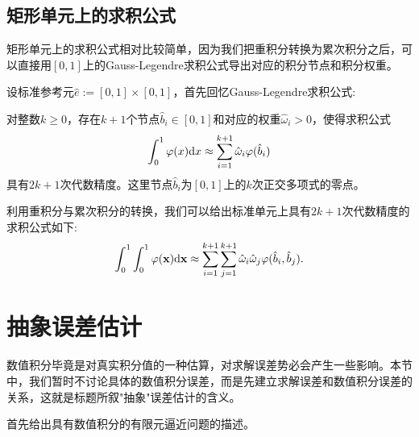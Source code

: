 \subsection{矩形单元上的求积公式}
矩形单元上的求积公式相对比较简单，因为我们把重积分转换为累次积分之后，可以直接用$[0,1]$上的Gauss-Legendre求积公式导出对应的积分节点和积分权重。

设标准参考元$\hat{e}:=[0,1]\times[0,1]$，首先回忆Gauss-Legendre求积公式:
\begin{definition}
    对整数$k\ge 0$，存在$k+1$个节点$\hat{b}_{i}\in [0,1]$和对应的权重$\hat{\omega}_{i}>0$，使得求积公式
    \begin{equation}
        \int_{0}^{1}\varphi(x)\mathrm{d} x\approx\sum_{i=1}^{k+1}\hat{\omega}_{i}\varphi(\hat{b}_{i})
    \end{equation}
    具有$2k+1$次代数精度。这里节点$\hat{b}_{i}$为$[0,1]$上的$k$次正交多项式的零点。
\end{definition}
利用重积分与累次积分的转换，我们可以给出标准单元上具有$2k+1$次代数精度的求积公式如下:
\begin{equation}
    \int_{0}^{1}\int_{0}^{1}\varphi(\mathbf{x})\mathrm{d}\mathbf{x}\approx\sum_{i=1}^{k+1}\sum_{j=1}^{k+1}\hat{\omega}_{i}\hat{\omega}_{j}\varphi(\hat{b}_{i},\hat{b}_{j}).
\end{equation}
\section{抽象误差估计}
数值积分毕竟是对真实积分值的一种估算，对求解误差势必会产生一些影响。本节中，我们暂时不讨论具体的数值积分误差，而是先建立求解误差和数值积分误差的关系，这就是标题所叙"抽象"误差估计的含义。

首先给出具有数值积分的有限元逼近问题的描述。

